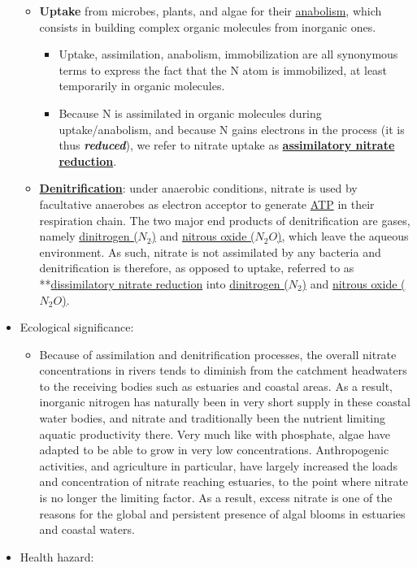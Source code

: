 \documentclass[]{book}
\providecommand{\tightlist}{%
  \setlength{\itemsep}{0pt}\setlength{\parskip}{0pt}}
\theoremstyle{definition}
\theoremstyle{definition}
\theoremstyle{definition}
\theoremstyle{remark}
\begin{document}
\begin{itemize}
  \begin{itemize}
  \tightlist
  \item
    \textbf{Uptake} from microbes, plants, and algae for their
    \protect\hyperlink{anabolism}{anabolism}, which consists in building
    complex organic molecules from inorganic ones.

    \begin{itemize}
    \tightlist
    \item
      Uptake, assimilation, anabolism, immobilization are all synonymous
      terms to express the fact that the N atom is immobilized, at least
      temporarily in organic molecules.
    \item
      Because N is assimilated in organic molecules during
      uptake/anabolism, and because N gains electrons in the process (it
      is thus \textbf{\emph{reduced}}), we refer to nitrate uptake as
      \textbf{\protect\hyperlink{ANR}{assimilatory nitrate reduction}}.
    \end{itemize}
  \item
    \textbf{\protect\hyperlink{denitrification}{Denitrification}}: under
    anaerobic conditions, nitrate is used by facultative anaerobes as
    electron acceptor to generate \protect\hyperlink{ATP}{ATP} in their
    respiration chain. The two major end products of denitrification are
    gases, namely \protect\hyperlink{N2}{dinitrogen (\(N_2\))} and
    \protect\hyperlink{N2O}{nitrous oxide (\(N_2O\))}, which leave the
    aqueous environment. As such, nitrate is not assimilated by any
    bacteria and denitrification is therefore, as opposed to uptake,
    referred to as **\protect\hyperlink{DNR}{dissimilatory nitrate
    reduction} into \protect\hyperlink{N2}{dinitrogen (\(N_2\))} and
    \protect\hyperlink{N2O}{nitrous oxide (\(N_2O\))}.
  \end{itemize}
\item
  Ecological significance:

  \begin{itemize}
  \tightlist
  \item
    Because of assimilation and denitrification processes, the overall
    nitrate concentrations in rivers tends to diminish from the
    catchment headwaters to the receiving bodies such as estuaries and
    coastal areas. As a result, inorganic nitrogen has naturally been in
    very short supply in these coastal water bodies, and nitrate and
    traditionally been the nutrient limiting aquatic productivity there.
    Very much like with phosphate, algae have adapted to be able to grow
    in very low concentrations. Anthropogenic activities, and
    agriculture in particular, have largely increased the loads and
    concentration of nitrate reaching estuaries, to the point where
    nitrate is no longer the limiting factor. As a result, excess
    nitrate is one of the reasons for the global and persistent presence
    of algal blooms in estuaries and coastal waters.
  \end{itemize}
\item
  Health hazard:


\end{itemize}
\end{document}
